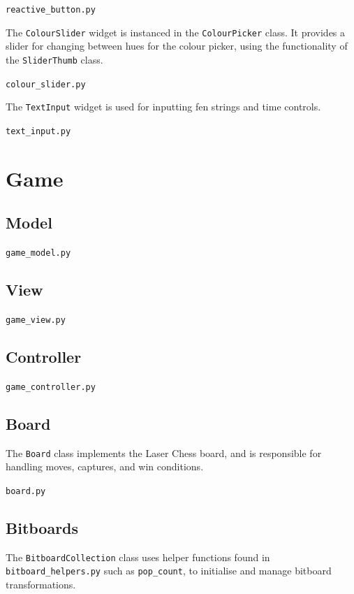 \documentclass[../main/main.tex]{subfiles}
\begin{document}
\noindent\verb|reactive_button.py|


\bigskip
\noindent The \lstinline{ColourSlider} widget is instanced in the \lstinline{ColourPicker} class. It provides a slider for changing between hues for the colour picker, using the functionality of the \lstinline{SliderThumb} class.

\noindent\verb|colour_slider.py|


\bigskip
\noindent The \lstinline{TextInput} widget is used for inputting fen strings and time controls.

\noindent\verb|text_input.py|


\section{Game}
\subsection{Model}
\noindent\verb|game_model.py|


\subsection{View}
\noindent\verb|game_view.py|


\subsection{Controller}
\noindent\verb|game_controller.py|


\subsection{Board}
The \lstinline{Board} class implements the Laser Chess board, and is responsible for handling moves, captures, and win conditions.

\noindent\verb|board.py|


\subsection{Bitboards}
\label{sec:bitboards}
The \lstinline{BitboardCollection} class uses helper functions found in \lstinline{bitboard_helpers.py} such as \lstinline{pop_count}, to initialise and manage bitboard transformations.
\end{document}
